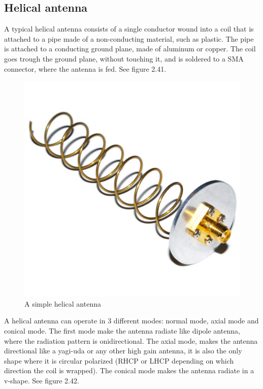 \subsection{Helical antenna}
A typical helical antenna consists of a single conductor wound into a coil that is attached to a pipe made of a non-conducting material, such as plastic. The pipe is attached to a conducting ground plane, made of aluminum or copper. The coil goes trough the ground plane, without touching it, and is soldered to a SMA connector, where the antenna is fed. See figure 2.41. 

\begin{figure}[h]
\centering
\includegraphics[scale=0.6]{figures/HelixAntenna.jpg}
\caption{A simple helical antenna\cite{HelicalAntenna}}
\end{figure}

A helical antenna can operate in 3 different modes: normal mode, axial mode and conical mode. The first mode make the antenna radiate like dipole antenna, where the radiation pattern is onidirectional. The axial mode, makes the antenna directional like a yagi-uda or any other high gain antenna, it is also the only shape where it is circular polarized (RHCP or LHCP depending on which direction the coil is wrapped). The conical mode makes the antenna radiate in a v-shape. See figure 2.42. 


